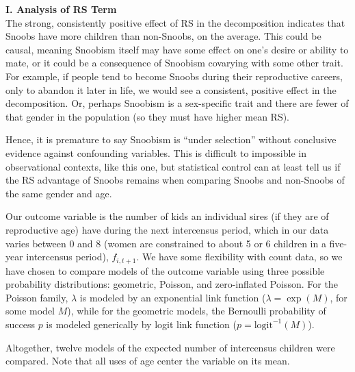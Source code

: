 \documentclass[11pt]{article}
\begin{document}
\newpage
\textbf{I. Analysis of RS Term}\\

The strong, consistently positive effect of RS in the decomposition indicates that Snoobs have more children than non-Snoobs, on the average.  This could be causal, meaning Snoobism itself may have some effect on one's desire or ability to mate, or it could be a consequence of Snoobism covarying with some other trait.  For example, if people tend to become Snoobs during their reproductive careers, only to abandon it later in life, we would see a consistent, positive effect in the decomposition.  Or, perhaps Snoobism is a sex-specific trait and there are fewer of that gender in the population (so they must have higher mean RS).  

Hence, it is premature to say Snoobism is ``under selection'' without conclusive evidence against confounding variables.  This is difficult to impossible in observational contexts, like this one, but statistical control can at least tell us if the RS advantage of Snoobs remains when comparing Snoobs and non-Snoobs of the same gender and age.  

Our outcome variable is the number of kids an individual sires (if they are of reproductive age) have during the next intercensus period, which in our data varies between 0 and 8 (women are constrained to about 5 or 6 children in a five-year intercensus period), $f_{i, t+1}$.  We have some flexibility with count data, so we have chosen to compare models of the outcome variable using three possible probability distributions: geometric, Poisson, and zero-inflated Poisson.  For the Poisson family, $\lambda$ is modeled by an exponential link function ($\lambda = \exp(M)$, for some model $M$), while for the geometric models, the Bernoulli probability of success $p$ is modeled generically by logit link function ($p=\mathrm{logit}^{-1}(M)$).  

Altogether, twelve models of the expected number of intercensus children were compared.  Note that all uses of age center the variable on its mean.
\end{document}
